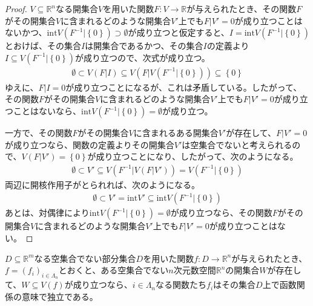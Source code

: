 \documentclass[dvipdfmx]{jsarticle}
\begin{document}
\begin{proof}
$V \subseteq \mathbb{R}^{n}$なる開集合$V$を用いた関数$F:V \rightarrow \mathbb{R}$が与えられたとき、その関数$F$がその開集合$V$に含まれるどのような開集合$V'$上でも$F|V' = 0$が成り立つことはないかつ、$\mathrm{int}{V\left( F^{- 1}|\left\{ 0 \right\} \right)} \supset \emptyset$が成り立つと仮定すると、$I = \mathrm{int}{V\left( F^{- 1}|\left\{ 0 \right\} \right)}$とおけば、その集合$I$は開集合であるかつ、その集合$I$の定義より$I \subseteq V\left( F^{- 1}|\left\{ 0 \right\} \right)$が成り立つので、次式が成り立つ。
\begin{align*}
\emptyset \subset V\left( F|I \right) \subseteq V\left( F|V\left( F^{- 1}|\left\{ 0 \right\} \right) \right) \subseteq \left\{ 0 \right\}
\end{align*}
ゆえに、$F|I = 0$が成り立つことになるが、これは矛盾している。したがって、その関数$F$がその開集合$V$に含まれるどのような開集合$V'$上でも$F|V' = 0$が成り立つことはないなら、$\mathrm{int}{V\left( F^{- 1}|\left\{ 0 \right\} \right)} = \emptyset$が成り立つ。\par
一方で、その関数$F$がその開集合$V$に含まれるある開集合$V'$が存在して、$F|V' = 0$が成り立つなら、関数の定義よりその開集合$V'$は空集合でないと考えられるので、$V\left( F|V' \right) = \left\{ 0 \right\}$が成り立つことになり、したがって、次のようになる。
\begin{align*}
\emptyset \subset V' \subseteq V\left( F^{- 1}|V\left( F|V' \right) \right) = V\left( F^{- 1}|\left\{ 0 \right\} \right)
\end{align*}
両辺に開核作用子がとられれば、次のようになる。
\begin{align*}
\emptyset \subset V' = \mathrm{int}V' \subseteq \mathrm{int}{V\left( F^{- 1}|\left\{ 0 \right\} \right)}
\end{align*}
あとは、対偶律により$\mathrm{int}{V\left( F^{- 1}|\left\{ 0 \right\} \right)} = \emptyset$が成り立つなら、その関数$F$がその開集合$V$に含まれるどのような開集合$V'$上でも$F|V' = 0$が成り立つことはない。
\end{proof}
\begin{thm}\label{4.4.2.8}
$D \subseteq \mathbb{R}^{m}$なる空集合でない部分集合$D$を用いた関数$f:D \rightarrow \mathbb{R}^{n}$が与えられたとき、$f = \left( f_{i} \right)_{i \in \varLambda_{n}}$とおくと、ある空集合でない$n$次元数空間$\mathbb{R}^{n}$の開集合$W$が存在して、$W \subseteq V(f)$が成り立つなら、$i \in \varLambda_{n}$なる関数たち$f_{i}$はその集合$D$上で函数関係の意味で独立である。
\end{thm}
\end{document}
